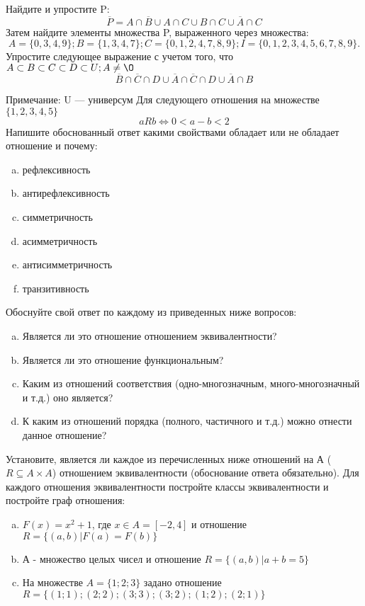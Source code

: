 \documentclass[10pt]{exam}
\begin{document}
\begin{questions}
\question
Найдите и упростите P:
\begin{equation*}
\overline{P} = A \cap \overline{B} \cup A \cap C \cup B \cap C \cup \overline{A} \cap C
\end{equation*}
Затем найдите элементы множества P, выраженного через множества:
\begin{equation*}
A = \{0, 3, 4, 9\}; 
B = \{1, 3, 4, 7\};
C = \{0, 1, 2, 4, 7, 8, 9\};
I = \{0, 1, 2, 3, 4, 5, 6, 7, 8, 9\}.
\end{equation*}\question
Упростите следующее выражение с учетом того, что $A\subset B \subset C \subset D \subset U; A \neq \O$
\begin{equation*}
\overline{B} \cap \overline{C} \cap D \cup \overline{A} \cap \overline{C} \cap D \cup \overline{A} \cap B
\end{equation*}

Примечание: U — универсум\question
Для следующего отношения на множестве $\{1, 2, 3, 4, 5\}$ 
\begin{equation*}
aRb \iff 0 < a-b<2
\end{equation*}
Напишите обоснованный ответ какими свойствами обладает или не обладает отношение и почему:   
\begin{enumerate} [a)]\setcounter{enumi}{0}
\item рефлексивность
\item антирефлексивность
\item симметричность
\item асимметричность
\item антисимметричность
\item транзитивность
\end{enumerate}

Обоснуйте свой ответ по каждому из приведенных ниже вопросов:
\begin{enumerate} [a)]\setcounter{enumi}{0}
    \item Является ли это отношение отношением эквивалентности?
    \item Является ли это отношение функциональным?
    \item Каким из отношений соответствия (одно-многозначным, много-многозначный и т.д.) оно является?
    \item К каким из отношений порядка (полного, частичного и т.д.) можно отнести данное отношение?
\end{enumerate}
\question
Установите, является ли каждое из перечисленных ниже отношений на А ($R \subseteq A \times A$) отношением эквивалентности (обоснование ответа обязательно). Для каждого отношения эквивалентности постройте классы эквивалентности и постройте граф отношения:
\begin{enumerate} [a)]\setcounter{enumi}{0}
\item $F(x)=x^{2}+1$, где $x \in A = [-2, 4]$ и отношение $R = \{(a,b)|F(a) = F(b)\}$
\item А - множество целых чисел и отношение $R = \{(a,b)|a + b = 5\}$
\item На множестве $A = \{1; 2; 3\}$ задано отношение $R = \{(1; 1); (2; 2); (3; 3); (3; 2); (1; 2); (2; 1)\}$


\end{enumerate}
\end{questions}
\end{document}
